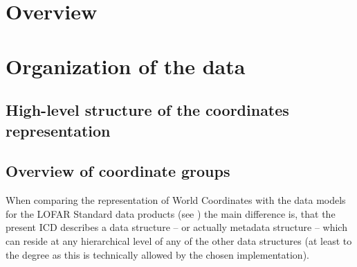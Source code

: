 \documentclass[a4paper,10pt,bibtotoc]{scrreprt}
\begin{document}



\chapter{Overview}
\label{sec:overview}

\chapter{Organization of the data}
\label{sec:organization}

\section{High-level structure of the coordinates representation}

\section{Overview of coordinate groups}

When comparing the representation of World Coordinates with the data
models for the LOFAR Standard data products (see \cite{lofar.icd.003,
  lofar.icd.004, lofar.icd.006,lofar.icd.007,lofar.icd.008})
the main difference is, that the present ICD describes a data
structure -- or actually metadata structure -- which can reside at any
hierarchical level of any of the other data structures (at least to
the degree as this is technically allowed by the chosen
implementation).
\end{document}
